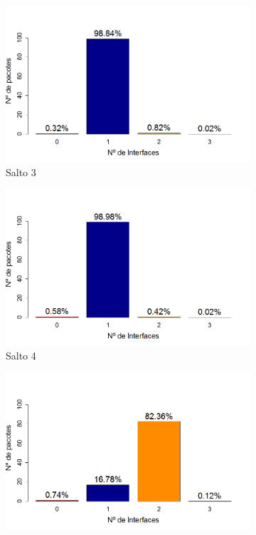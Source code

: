 \documentclass[
	12pt,				%
	openright,			%
	oneside,
	a4paper,			%
	english,			%
	french,				%
	spanish,			%
	brazil				%
	]{abntex2}
\begin{document}
\begin{figure}[t!]\ContinuedFloat		
	\begin{subfigure}{.5\textwidth}
		\centering
		\includegraphics[width=.98\linewidth]{DRP_OPT_Salto3}
		\captionsetup{width=.9\textwidth}
		\caption{Salto 3}
		\label{dpr_opt_s3}
	\end{subfigure}%
	\begin{subfigure}{.5\textwidth}
		\centering
		\includegraphics[width=.98\linewidth]{DRP_OPT_Salto4}
		\captionsetup{width=.9\textwidth}
		\caption{Salto 4}
		\label{dpr_opt_s4}
	\end{subfigure}
	\begin{subfigure}{.5\textwidth}
		\centering
		\includegraphics[width=.98\linewidth]{DRP_OPT_Salto5}

\end{subfigure}
\end{figure}
\end{document}
